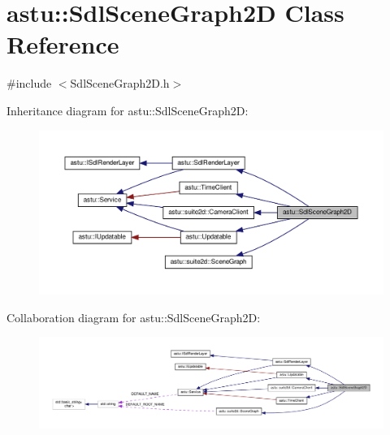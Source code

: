 \hypertarget{classastu_1_1SdlSceneGraph2D}{}\section{astu\+:\+:Sdl\+Scene\+Graph2D Class Reference}
\label{classastu_1_1SdlSceneGraph2D}


{\ttfamily \#include $<$Sdl\+Scene\+Graph2\+D.\+h$>$}



Inheritance diagram for astu\+:\+:Sdl\+Scene\+Graph2D\+:\nopagebreak
\begin{figure}[H]
\begin{center}
\leavevmode
\includegraphics[width=350pt]{classastu_1_1SdlSceneGraph2D__inherit__graph}
\end{center}
\end{figure}


Collaboration diagram for astu\+:\+:Sdl\+Scene\+Graph2D\+:\nopagebreak
\begin{figure}[H]
\begin{center}
\leavevmode
\includegraphics[width=350pt]{classastu_1_1SdlSceneGraph2D__coll__graph}
\end{center}
\end{figure}
